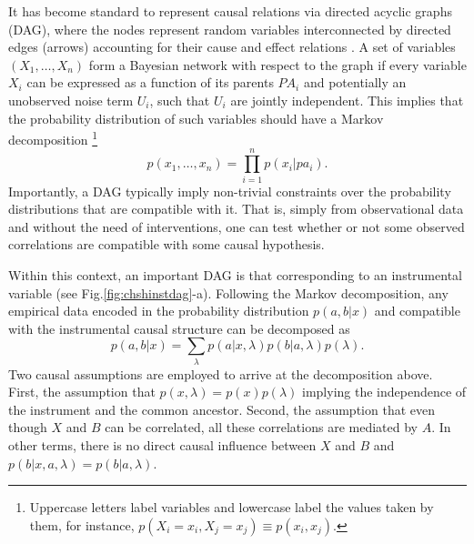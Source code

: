 \documentclass[letterpaper]{article}
\begin{document}
It has become standard to represent causal relations via directed acyclic graphs (DAG), where the nodes represent random variables interconnected by directed edges (arrows) accounting for their cause and effect relations \cite{pearlbook}. A set of variables  $\left( X_1,\dots, X_n \right)$ form a Bayesian network with respect to the graph if every variable $X_i$ can be expressed as a function of its parents $PA_i$ and potentially an unobserved noise term $U_i$, such that $U_i$ are jointly independent. This implies that the probability distribution of such variables should have a Markov decomposition \footnote{Uppercase letters label variables and lowercase label the values taken by them, for instance, $p(X_i =x_i
, X_j = x_j) ≡ p(x_i, x_j)$.}
\begin{equation}
p(x_1,\dots,x_n)= \prod_{i=1}^{n} p(x_i \vert pa_i).    
\end{equation}
Importantly, a DAG typically imply non-trivial constraints over the probability distributions that are compatible with it. That is, simply from observational data and without the need of interventions, one can test whether or not some observed correlations are compatible with some causal hypothesis.


Within this context, an important DAG is that corresponding to an instrumental variable (see Fig.\ref{fig:chshinstdag}-a). Following the Markov decomposition, any empirical data encoded in the probability distribution $p(a,b \vert x)$ and compatible with the instrumental causal structure can be decomposed as
\begin{equation}
p(a,b \vert x) = \sum_{\lambda} p(a\vert x,\lambda) p(b\vert a,\lambda)p(\lambda).
\end{equation}
Two causal assumptions are employed to arrive at the decomposition above. First, the assumption that $p(x,\lambda)=p(x)p(\lambda)$ implying the independence of the instrument and the common ancestor. Second, the assumption that even though $X$ and $B$ can be correlated, all these correlations are mediated by $A$. In other terms, there is no direct causal influence between $X$ and $B$ and  $p(b\vert x,a,\lambda)=p(b\vert a,\lambda)$.
\end{document}
